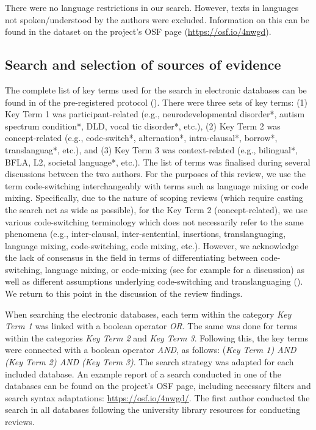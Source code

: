 \documentclass[output=paper]{langscibook}
\begin{document}
There were no language restrictions in our search. However, texts in languages not spoken/understood by the authors were excluded. Information on this can be found in the dataset on the project's OSF page (\url{https://osf.io/4nwgd}).

\subsection{Search and selection of sources of evidence}

The complete list of key terms used for the search in electronic databases can be found in  of the pre-registered protocol (\citealt{KascelanParafitaCouto2022}). There were three sets of key terms:
(1) Key Term 1 was participant-related (e.g., neurodevelopmental disorder*, autism spectrum condition*, DLD, vocal tic disorder*, etc.),
(2) Key Term 2 was concept-related (e.g., code-switch*, alternation*, intra-clausal*, borrow*, translanguag*, etc.), and
(3) Key Term 3 was context-related (e.g., bilingual*, BFLA, L2, societal language*, etc.). The list of terms was finalised during several discussions between the two authors. For the purposes of this review, we use the term code-switching interchangeably with terms such as language mixing or code mixing. Specifically, due to the nature of scoping reviews (which require casting the search net as wide as possible), for the Key Term 2 (concept-related), we use various code-switching terminology which does not necessarily refer to the same phenomena (e.g., inter-clausal, inter-sentential, insertions, translanguaging, language mixing, code-switching, code mixing, etc.). However, we acknowledge the lack of consensus in the field in terms of differentiating between code-switching, language mixing, or code-mixing (see for example \citealt{GullbergEtAl2009} for a discussion) as well as different assumptions underlying code-switching and translanguaging (\citealt{Balam2021, Li2018}). We return to this point in the discussion of the review findings.

When searching the electronic databases, each term within the category \textit{Key Term 1} was linked with a boolean operator \textit{OR}. The same was done for terms within the categories \textit{Key Term 2} and \textit{Key Term 3}. Following this, the key terms were connected with a boolean operator \textit{AND}, as follows: (\textit{Key Term 1) AND (Key Term 2) AND (Key Term 3)}. The search strategy was adapted for each included database. An example report of a search conducted in one of the databases can be found on the project's OSF page, including necessary filters and search syntax adaptations: \url{https://osf.io/4nwgd/}. The first author conducted the search in all databases following the university library resources for conducting reviews.
\end{document}

